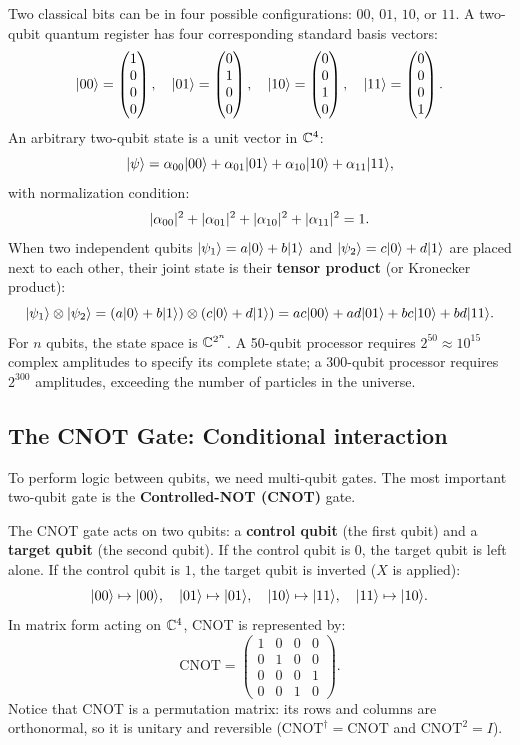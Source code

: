 Two classical bits can be in four possible configurations: $00$, $01$, $10$, or $11$.
A two-qubit quantum register has four corresponding standard basis vectors:
\[
  \lvert 00 \rangle = \begin{pmatrix}1\\0\\0\\0\end{pmatrix}, \quad
  \lvert 01 \rangle = \begin{pmatrix}0\\1\\0\\0\end{pmatrix}, \quad
  \lvert 10 \rangle = \begin{pmatrix}0\\0\\1\\0\end{pmatrix}, \quad
  \lvert 11 \rangle = \begin{pmatrix}0\\0\\0\\1\end{pmatrix}.
\]
An arbitrary two-qubit state is a unit vector in $\mathbb{C}^4$:
\[
  \lvert \psi \rangle = \alpha_{00}\lvert 00 \rangle + \alpha_{01}\lvert 01 \rangle + \alpha_{10}\lvert 10 \rangle + \alpha_{11}\lvert 11 \rangle,
\]
with normalization condition:
\[
  \lvert\alpha_{00}\rvert^2 + \lvert\alpha_{01}\rvert^2 + \lvert\alpha_{10}\rvert^2 + \lvert\alpha_{11}\rvert^2 = 1.
\]
When two independent qubits $\lvert \psi_1 \rangle = a\lvert 0 \rangle + b\lvert 1 \rangle$ and
$\lvert \psi_2 \rangle = c\lvert 0 \rangle + d\lvert 1 \rangle$ are placed next to each other, their joint state
is their \textbf{tensor product} (or Kronecker product):
\[
  \lvert \psi_1 \rangle \otimes \lvert \psi_2 \rangle
  = (a\lvert 0 \rangle + b\lvert 1 \rangle) \otimes (c\lvert 0 \rangle + d\lvert 1 \rangle)
  = ac\lvert 00 \rangle + ad\lvert 01 \rangle + bc\lvert 10 \rangle + bd\lvert 11 \rangle.
\]
For $n$ qubits, the state space is $\mathbb{C}^{2^n}$. A 50-qubit processor requires $2^{50} \approx 10^{15}$
complex amplitudes to specify its complete state; a 300-qubit processor requires $2^{300}$
amplitudes, exceeding the number of particles in the universe.

\subsection{The CNOT Gate: Conditional interaction}

To perform logic between qubits, we need multi-qubit gates. The most important two-qubit
gate is the \textbf{Controlled-NOT (CNOT)} gate.

The CNOT gate acts on two qubits: a \textbf{control qubit} (the first qubit) and a
\textbf{target qubit} (the second qubit). If the control qubit is $0$, the target qubit
is left alone. If the control qubit is $1$, the target qubit is inverted ($X$ is applied):
\[
  \lvert 00 \rangle \mapsto \lvert 00 \rangle, \quad
  \lvert 01 \rangle \mapsto \lvert 01 \rangle, \quad
  \lvert 10 \rangle \mapsto \lvert 11 \rangle, \quad
  \lvert 11 \rangle \mapsto \lvert 10 \rangle.
\]
In matrix form acting on $\mathbb{C}^4$, CNOT is represented by:
\[
  \text{CNOT} = \begin{pmatrix}
    1 & 0 & 0 & 0 \\
    0 & 1 & 0 & 0 \\
    0 & 0 & 0 & 1 \\
    0 & 0 & 1 & 0
  \end{pmatrix}.
\]
Notice that CNOT is a permutation matrix: its rows and columns are orthonormal, so it is
unitary and reversible ($\text{CNOT}^\dagger = \text{CNOT}$ and $\text{CNOT}^2 = I$).

